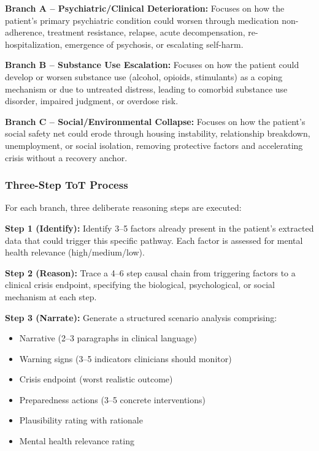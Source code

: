 \documentclass[conference]{IEEEtran}
\begin{document}
\textbf{Branch A -- Psychiatric/Clinical Deterioration:} Focuses on how the patient's primary psychiatric condition could worsen through medication non-adherence, treatment resistance, relapse, acute decompensation, re-hospitalization, emergence of psychosis, or escalating self-harm.

\textbf{Branch B -- Substance Use Escalation:} Focuses on how the patient could develop or worsen substance use (alcohol, opioids, stimulants) as a coping mechanism or due to untreated distress, leading to comorbid substance use disorder, impaired judgment, or overdose risk.

\textbf{Branch C -- Social/Environmental Collapse:} Focuses on how the patient's social safety net could erode through housing instability, relationship breakdown, unemployment, or social isolation, removing protective factors and accelerating crisis without a recovery anchor.

\subsubsection{Three-Step ToT Process}
For each branch, three deliberate reasoning steps are executed:

\textbf{Step 1 (Identify):} Identify 3--5 factors already present in the patient's extracted data that could trigger this specific pathway. Each factor is assessed for mental health relevance (high/medium/low).

\textbf{Step 2 (Reason):} Trace a 4--6 step causal chain from triggering factors to a clinical crisis endpoint, specifying the biological, psychological, or social mechanism at each step.

\textbf{Step 3 (Narrate):} Generate a structured scenario analysis comprising:
\begin{itemize}
\item Narrative (2--3 paragraphs in clinical language)
\item Warning signs (3--5 indicators clinicians should monitor)
\item Crisis endpoint (worst realistic outcome)
\item Preparedness actions (3--5 concrete interventions)
\item Plausibility rating with rationale
\item Mental health relevance rating
\end{itemize}
\end{document}
